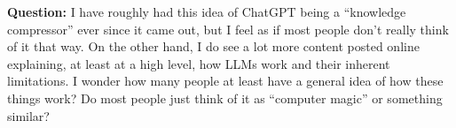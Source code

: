\textbf{Question:}
I have roughly had this idea of ChatGPT being a ``knowledge compressor'' ever since it came out, but I feel as if most people don't really think of it that way.
On the other hand, I do see a lot more content posted online explaining, at least at a high level, how LLMs work and their inherent limitations.
I wonder how many people at least have a general idea of how these things work?
Do most people just think of it as ``computer magic'' or something similar?